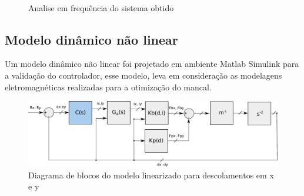 \begin{figure}[!ht]
	\centering
	\\
	
	\caption{Analise em frequência do sistema obtido}
	\label{fig:bode:rlocus:pnt:operacao}
\end{figure}

\subsection{Modelo dinâmico não linear}

Um modelo dinâmico não linear foi projetado em ambiente Matlab Simulink para a validação do controlador, esse modelo, leva em consideração as modelagens eletromagnéticas realizadas para a otimização do mancal.


\begin{figure}[th!]
	\centering
	\includegraphics[width=1\linewidth]{../Figs/Modelagem/diagrama_blocos_modelo_linear}
	\caption{Diagrama de blocos do modelo linearizado para descolamentos em x e y}
	\label{fig:diagrama:blocos:modelo:linear}
\end{figure}

